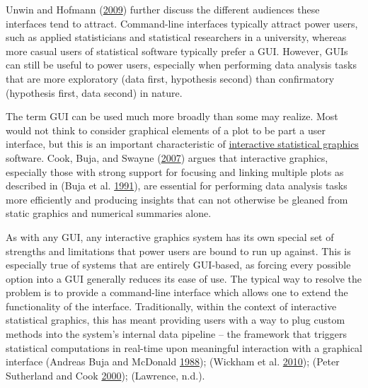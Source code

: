 \documentclass[12pt,]{isuthesis}
\begin{document}
Unwin and Hofmann (\protect\hyperlink{ref-Unwin:1999vp}{2009}) further
discuss the different audiences these interfaces tend to attract.
Command-line interfaces typically attract power users, such as applied
statisticians and statistical researchers in a university, whereas more
casual users of statistical software typically prefer a GUI. However,
GUIs can still be useful to power users, especially when performing data
analysis tasks that are more exploratory (data first, hypothesis second)
than confirmatory (hypothesis first, data second) in nature.

The term GUI can be used much more broadly than some may realize. Most
would not think to consider graphical elements of a plot to be part a
user interface, but this is an important characteristic of
\protect\hyperlink{dynamic-interactive-statistical-web-graphics}{interactive
statistical graphics} software. Cook, Buja, and Swayne
(\protect\hyperlink{ref-Cook:2007uk}{2007}) argues that interactive
graphics, especially those with strong support for focusing and linking
multiple plots as described in (Buja et al.
\protect\hyperlink{ref-Buja:1991vh}{1991}), are essential for performing
data analysis tasks more efficiently and producing insights that can not
otherwise be gleaned from static graphics and numerical summaries alone.

As with any GUI, any interactive graphics system has its own special set
of strengths and limitations that power users are bound to run up
against. This is especially true of systems that are entirely GUI-based,
as forcing every possible option into a GUI generally reduces its ease
of use. The typical way to resolve the problem is to provide a
command-line interface which allows one to extend the functionality of
the interface. Traditionally, within the context of interactive
statistical graphics, this has meant providing users with a way to plug
custom methods into the system's internal data pipeline -- the framework
that triggers statistical computations in real-time upon meaningful
interaction with a graphical interface (Andreas Buja and McDonald
\protect\hyperlink{ref-viewing-pipeline}{1988}); (Wickham et al.
\protect\hyperlink{ref-plumbing}{2010}); (Peter Sutherland and Cook
\protect\hyperlink{ref-orca}{2000}); (Lawrence, n.d.).
\end{document}

